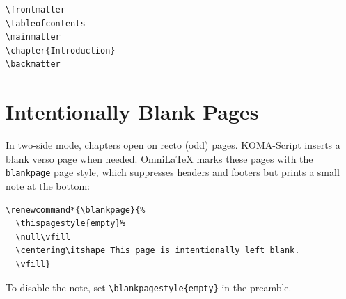 \begin{verbatim}
\frontmatter
\tableofcontents
\mainmatter
\chapter{Introduction}
\backmatter

\end{verbatim}

\section{Intentionally Blank Pages}

In two-side mode, chapters open on recto (odd) pages.  KOMA-Script
inserts a blank verso page when needed.  OmniLaTeX marks these pages with
the \texttt{blankpage} page style, which suppresses headers and footers
but prints a small note at the bottom:

\begin{verbatim}
\renewcommand*{\blankpage}{%
  \thispagestyle{empty}%
  \null\vfill
  \centering\itshape This page is intentionally left blank.
  \vfill}
\end{verbatim}

To disable the note, set \verb|\blankpagestyle{empty}| in the preamble.
